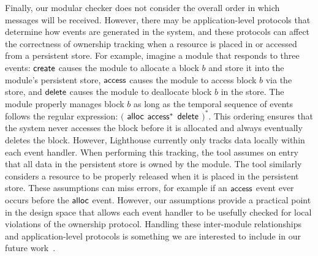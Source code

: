 Finally, our modular checker does not consider the overall order in
which messages will be received.  However, there may be
application-level protocols that determine how events are generated in
the system, and these protocols can affect the correctness of
ownership tracking when a resource is placed in or accessed from a
persistent store.
%
For example, imagine a module that responds to three events: ${\mathsf{create}}$
causes the module to allocate a block $b$ and store it into the
module's persistent store, ${\mathsf{access}}$ causes the module to access block
$b$ via the  store, and ${\mathsf{delete}}$ causes the module to deallocate
block $b$ in the store.  The module properly manages block $b$ as
long as the temporal sequence of events follows the regular expression:
$($ ${\mathsf{alloc}}$ ${\mathsf{access}}^*$ ${\mathsf{delete}}$ $)^*$.  This ordering ensures that the system
never accesses the block before it is allocated and always eventually
deletes the block.
%
However, Lighthouse currently only tracks data locally within each event handler.
When performing this tracking, the tool assumes on entry that all data
in the persistent store is owned by the module.  The tool similarly
considers a resource to be properly released when it is placed in the
persistent store.  These assumptions can miss errors, for example if
an ${\mathsf{access}}$ event ever occurs before the ${\mathsf{alloc}}$ event.  However,
our assumptions provide a practical point in the design space that
allows each event handler to be usefully checked for local violations
of the ownership protocol.
Handling these inter-module relationships and application-level
protocols is something we are interested to include in our future
work~\cite{AlurPOPL05,HJM05}.

